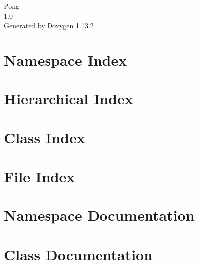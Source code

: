 \documentclass[twoside]{book}
\newcommand{\+}{\discretionary{\mbox{\scriptsize$\hookleftarrow$}}{}{}}
\newcommand{\clearemptydoublepage}{%
    \newpage{\pagestyle{empty}\cleardoublepage}%
  }
\begin{document}
  \raggedbottom
    \hypersetup{pageanchor=false,
                bookmarksnumbered=true,
                pdfencoding=unicode
               }
  \begin{titlepage}
  \vspace*{7cm}
  \begin{center}%
  {\Large Pong}\\
  [1ex]\large 1.\+0 \\
  \vspace*{1cm}
  {\large Generated by Doxygen 1.13.2}\\
  \end{center}
  \end{titlepage}
  \clearemptydoublepage
  \tableofcontents
  \clearemptydoublepage
  \hypersetup{pageanchor=true}
\chapter{Namespace Index}

\chapter{Hierarchical Index}

\chapter{Class Index}

\chapter{File Index}

\chapter{Namespace Documentation}


\chapter{Class Documentation}

















\end{document}
